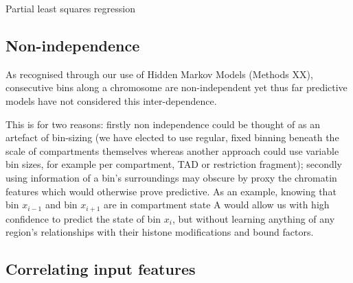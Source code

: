 \documentclass[a4paper,11pt,oneside]{book}
\begin{document}
Partial least squares regression

\subsection{Non-independence}


As recognised through our use of Hidden Markov Models (Methods XX), consecutive bins along a chromosome are non-independent yet thus far predictive models have not considered this inter-dependence. 

This is for two reasons: firstly non independence could be thought of as an artefact of bin-sizing (we have elected to use regular, fixed binning beneath the scale of compartments themselves whereas another approach could use variable bin sizes, for example per compartment, TAD or restriction fragment); secondly using information of a bin's surroundings may obscure by proxy the chromatin features which would otherwise prove predictive. As an example, knowing that bin $x_{i-1}$ and bin $x_{i+1}$ are in compartment state A would allow us with high confidence to predict the state of bin $x_i$, but without learning anything of any region's relationships with their histone modifications and bound factors.

\subsection{Correlating input features}

\ifstandalone
\begin{small}

\end{small}
\fi
\end{document}
